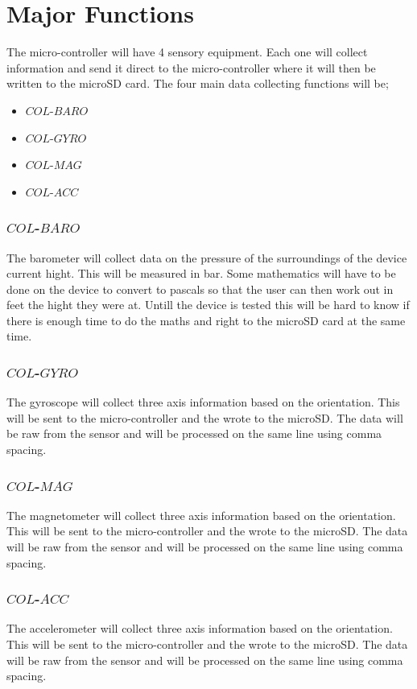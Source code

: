 \documentclass{report}
\begin{document}
\section{Major Functions}
The micro-controller will have 4 sensory equipment. Each one will collect information and send it direct to the micro-controller where it will then be written to the microSD card. The four main data collecting functions will be;

\begin{itemize}
\item $COL$-$BARO$
\item $COL$-$GYRO$
\item $COL$-$MAG$
\item $COL$-$ACC$
\end{itemize}

\subsubsection{$COL$-$BARO$}
The barometer will collect data on the pressure of the surroundings of the device current hight. This will be measured in bar. Some mathematics will have to be done on the device to convert to pascals so that the user can then work out in feet the hight they were at. Untill the device is tested this will be hard to know if there is enough time to do the maths and right to the microSD card at the same time. 
\subsubsection{$COL$-$GYRO$}
The gyroscope will collect three axis information based on the orientation. This will be sent to the micro-controller and the wrote to the microSD. The data will be raw from the sensor and will be processed on the same line using comma spacing.
\subsubsection{$COL$-$MAG$}
The magnetometer will collect three axis information based on the orientation. This will be sent to the micro-controller and the wrote to the microSD. The data will be raw from the sensor and will be processed on the same line using comma spacing.
\subsubsection{$COL$-$ACC$}
The accelerometer will collect three axis information based on the orientation. This will be sent to the micro-controller and the wrote to the microSD. The data will be raw from the sensor and will be processed on the same line using comma spacing.
\end{document}
